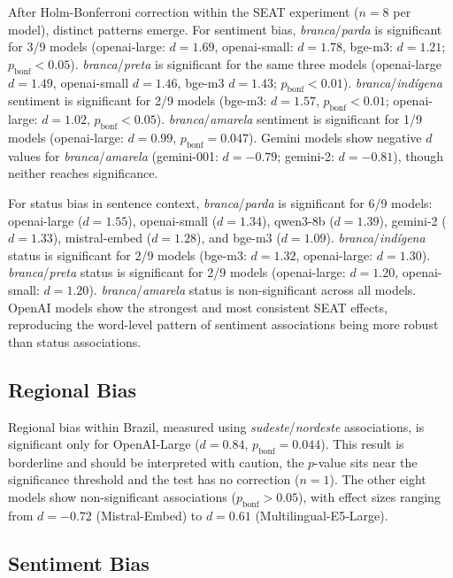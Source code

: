 \documentclass{sbc2019}
\begin{document}
After Holm-Bonferroni correction within the SEAT experiment ($n = 8$ per model), distinct patterns emerge. For sentiment bias, \textit{branca}/\textit{parda} is significant for 3/9 models (openai-large: $d = 1.69$, openai-small: $d = 1.78$, bge-m3: $d = 1.21$; $p_{\mathrm{bonf}} < 0.05$). \textit{branca}/\textit{preta} is significant for the same three models (openai-large $d = 1.49$, openai-small $d = 1.46$, bge-m3 $d = 1.43$; $p_{\mathrm{bonf}} < 0.01$). \textit{branca}/\textit{ind\'{i}gena} sentiment is significant for 2/9 models (bge-m3: $d = 1.57$, $p_{\mathrm{bonf}} < 0.01$; openai-large: $d = 1.02$, $p_{\mathrm{bonf}} < 0.05$). \textit{branca}/\textit{amarela} sentiment is significant for 1/9 models (openai-large: $d = 0.99$, $p_{\mathrm{bonf}} = 0.047$). Gemini models show negative $d$ values for \textit{branca}/\textit{amarela} (gemini-001: $d = -0.79$; gemini-2: $d = -0.81$), though neither reaches significance.

For status bias in sentence context, \textit{branca}/\textit{parda} is significant for 6/9 models: openai-large ($d = 1.55$), openai-small ($d = 1.34$), qwen3-8b ($d = 1.39$), gemini-2 ($d = 1.33$), mistral-embed ($d = 1.28$), and bge-m3 ($d = 1.09$). \textit{branca}/\textit{ind\'{i}gena} status is significant for 2/9 models (bge-m3: $d = 1.32$, openai-large: $d = 1.30$). \textit{branca}/\textit{preta} status is significant for 2/9 models (openai-large: $d = 1.20$, openai-small: $d = 1.20$). \textit{branca}/\textit{amarela} status is non-significant across all models. OpenAI models show the strongest and most consistent SEAT effects, reproducing the word-level pattern of sentiment associations being more robust than status associations.

\subsection{Regional Bias}

Regional bias within Brazil, measured using \textit{sudeste}/\textit{nordeste} associations, is significant only for OpenAI-Large ($d = 0.84$, $p_{\mathrm{bonf}} = 0.044$). This result is borderline and should be interpreted with caution, the $p$-value sits near the significance threshold and the test has no correction ($n = 1$). The other eight models show non-significant associations ($p_{\mathrm{bonf}} > 0.05$), with effect sizes ranging from $d = -0.72$ (Mistral-Embed) to $d = 0.61$ (Multilingual-E5-Large).

\subsection{Sentiment Bias}
\end{document}
